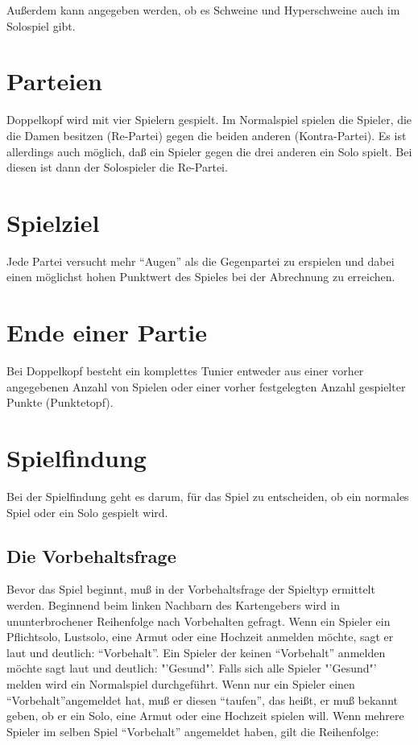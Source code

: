 \documentclass{scrartcl}
\begin{document}
Außerdem kann angegeben werden, ob es Schweine und Hyperschweine auch im Solospiel gibt.

\section{Parteien}
Doppelkopf wird mit vier Spielern gespielt. Im Normalspiel spielen die Spieler, die die \kreuz Damen besitzen (Re-Partei) gegen die beiden anderen (Kontra-Partei). Es ist allerdings auch möglich, daß ein Spieler gegen die drei anderen ein Solo spielt.  Bei diesen ist dann der Solospieler die Re-Partei.

\section{Spielziel}
Jede Partei versucht mehr "`Augen"' als die Gegenpartei zu erspielen und dabei einen möglichst hohen Punktwert des Spieles bei der Abrechnung zu erreichen.

\section{Ende einer Partie}
Bei Doppelkopf besteht ein komplettes Tunier entweder aus einer vorher angegebenen Anzahl von Spielen oder einer vorher festgelegten Anzahl gespielter Punkte (Punktetopf).

\section{Spielfindung}
Bei der Spielfindung geht es darum, für das Spiel zu entscheiden, ob ein normales Spiel oder ein Solo gespielt wird.

\subsection{Die Vorbehaltsfrage}
Bevor das Spiel beginnt, muß in der Vorbehaltsfrage der Spieltyp ermittelt werden. Beginnend beim linken Nachbarn des Kartengebers wird in ununterbrochener Reihenfolge nach Vorbehalten gefragt.  Wenn ein Spieler ein Pflichtsolo, Lustsolo, eine Armut oder eine Hochzeit anmelden möchte, sagt er laut und deutlich: "`Vorbehalt"'. Ein Spieler der keinen "`Vorbehalt"' anmelden möchte sagt laut und deutlich: "'Gesund"'. Falls sich alle Spieler "'Gesund"' melden wird ein Normalspiel durchgeführt.  Wenn nur ein Spieler einen "`Vorbehalt"'angemeldet hat, muß er diesen "`taufen"', das heißt, er muß bekannt geben, ob er ein Solo, eine Armut oder eine Hochzeit spielen will. Wenn mehrere Spieler im selben Spiel "`Vorbehalt"' angemeldet haben, gilt die Reihenfolge:
\end{document}
